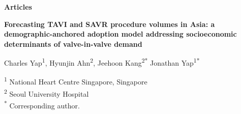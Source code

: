 \documentclass[10pt, a4paper]{article}
\begin{document}

\vspace*{-0.5cm}
{\small\color{lancetgrey}\textbf{Articles}}
\vspace{6pt}

{\LARGE\bfseries\color{lancetred}
Forecasting TAVI and SAVR procedure volumes in Asia: a demographic-anchored adoption model addressing socioeconomic determinants of valve-in-valve demand
\par}

\vspace{10pt}

{\normalsize
Charles Yap\textsuperscript{1},
Hyunjin Ahn\textsuperscript{2},
Jeehoon Kang\textsuperscript{2*}
Jonathan Yap\textsuperscript{1*}
}

\vspace{4pt}

{\small\color{lancetgrey}
\textsuperscript{1} National Heart Centre Singapore, Singapore\\
\textsuperscript{2} Seoul University Hospital\\[2pt]
\textsuperscript{*} Corresponding author.
}

\vspace{14pt}
\end{document}
